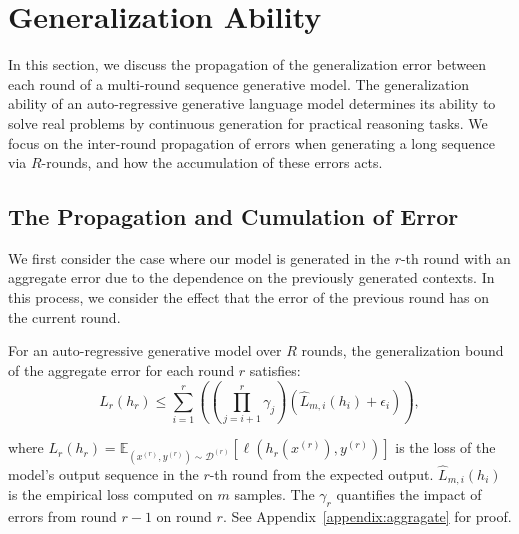 \section{Generalization Ability}\label{section6}
In this section, we discuss the propagation of the generalization error between each round of a multi-round sequence generative model.  The generalization ability of an auto-regressive generative language model determines its ability to solve real problems by continuous generation for practical reasoning tasks. We focus on the inter-round propagation of errors when generating a long sequence via \(R\)-rounds, and how the accumulation of these errors acts.

\subsection{The Propagation and Cumulation of Error}

We first consider the case where our model is generated in the \(r\)-th round with an aggregate error due to the dependence on the previously generated contexts. In this process, we consider the effect that the error of the previous round has on the current round.


\begin{lemma}\label{aggregate}
For an auto-regressive generative model over \(R\) rounds, the generalization bound of the aggregate error for each round \(r\) satisfies:
    \[
L_{r}(h_{r}) \leq \sum_{i=1}^{r} \left( \left( \prod_{j=i+1}^{r} \gamma_j \right) \left( \hat{L}_{m,i}(h_{i}) + \epsilon_i \right) \right),
\]
\end{lemma}
where \( L_{r}(h_{r}) = \mathbb{E}_{(x^{(r)}, y^{(r)}) \sim \mathcal{D}^{(r)}} [ \ell(h_{r}(x^{(r)}), y^{(r)}) ] \) is the loss of the model's output sequence in the \(r\)-th round from the expected output. \(\hat{L}_{m,i}(h_{i})\) is the empirical loss computed on \(m\) samples. The \( \gamma_r \) quantifies the impact of errors from round \( r-1 \) on round \( r \). See Appendix~\ref{appendix:aggragate} for proof.

